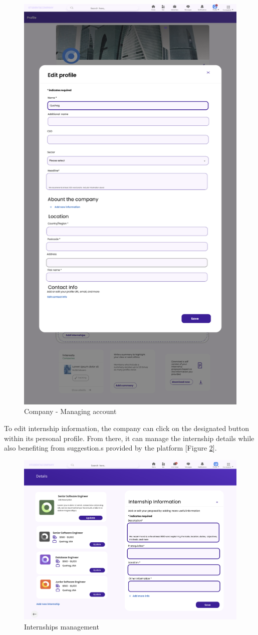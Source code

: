 \begin{figure} [H]
    \centering
    \includegraphics[width=0.5\linewidth]{Images/Interface Images/company interface/Screenshot 2024-12-12 045535.png}
    \caption{Company - Managing account}
    \label{fig:Company - Managing account}
\end{figure}


To edit internship information, the company can click on the designated button within its personal profile. From there, it can manage the internship details while also benefiting from suggestion.s provided by the platform [Figure \ref{fig:Internships management}]. 

\begin{figure} [H]
    \centering
    \includegraphics[width=0.5\linewidth]{Images/Interface Images/company interface/Screenshot 2024-12-12 050044.png}
    \caption{Internships management}
    \label{fig:Internships management}
\end{figure}

